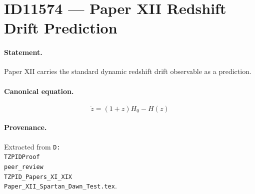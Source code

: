 \section*{ID11574 --- Paper XII Redshift Drift Prediction}

\paragraph{Statement.}
Paper XII carries the standard dynamic redshift drift observable as a prediction.

\paragraph{Canonical equation.}
\[
\dot z=(1+z)H_0-H(z)
\]

\paragraph{Provenance.}
Extracted from \texttt{D:\\TZPIDProof\\peer\_review\\TZPID\_Papers\_XI\_XIX\\Paper\_XII\_Spartan\_Dawn\_Test.tex}.
